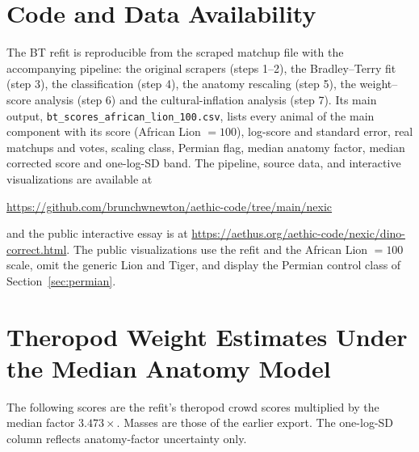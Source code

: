 \documentclass[11pt]{article}
\begin{document}
\section{Code and Data Availability}
\label{sec:code}
The BT refit is reproducible from the scraped matchup file with the accompanying pipeline: the original scrapers (steps 1--2), the Bradley--Terry fit (step 3), the classification (step 4), the anatomy rescaling (step 5), the weight--score analysis (step 6) and the cultural-inflation analysis (step 7). Its main output, \texttt{bt\_scores\_african\_lion\_100.csv}, lists every animal of the main component with its score (African Lion $=100$), log-score and standard error, real matchups and votes, scaling class, Permian flag, median anatomy factor, median corrected score and one-log-SD band. The pipeline, source data, and interactive visualizations are available at
\begin{center}
\url{https://github.com/brunchwnewton/aethic-code/tree/main/nexic}
\end{center}
and the public interactive essay is at \url{https://aethus.org/aethic-code/nexic/dino-correct.html}. The public visualizations use the refit and the African Lion $=100$ scale, omit the generic Lion and Tiger, and display the Permian control class of Section~\ref{sec:permian}.

\appendix
\newpage
\section{Theropod Weight Estimates Under the Median Anatomy Model}
\label{app:theropod_weights}

The following scores are the refit's theropod crowd scores multiplied by the median factor $3.473\times$. Masses are those of the earlier export. The one-log-SD column reflects anatomy-factor uncertainty only.
\end{document}

